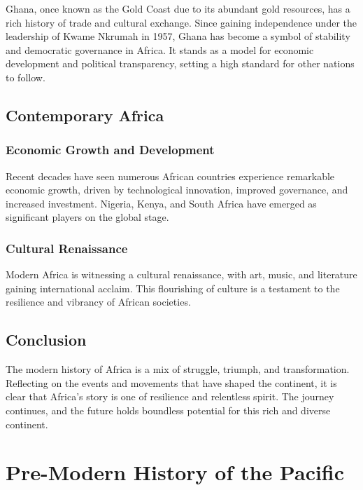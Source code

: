 \documentclass[a4paper,12pt]{book}
\begin{document}
Ghana, once known as the Gold Coast due to its abundant gold resources, has a rich history of trade and cultural exchange. Since gaining independence under the leadership of Kwame Nkrumah in 1957, Ghana has become a symbol of stability and democratic governance in Africa. It stands as a model for economic development and political transparency, setting a high standard for other nations to follow.

\section{Contemporary Africa}
\label{sec:contemporary-africa}

\subsection{Economic Growth and Development}
\label{subsec:economic-growth-and-development}

Recent decades have seen numerous African countries experience remarkable economic growth, driven by technological innovation, improved governance, and increased investment. Nigeria, Kenya, and South Africa have emerged as significant players on the global stage.

\subsection{Cultural Renaissance}
\label{subsec:cultural-renaissance}

Modern Africa is witnessing a cultural renaissance, with art, music, and literature gaining international acclaim. This flourishing of culture is a testament to the resilience and vibrancy of African societies.

\section{Conclusion}
\label{sec:conclusion-modern-africa}

The modern history of Africa is a mix of struggle, triumph, and transformation. Reflecting on the events and movements that have shaped the continent, it is clear that Africa’s story is one of resilience and relentless spirit. The journey continues, and the future holds boundless potential for this rich and diverse continent.

\chapter{Pre-Modern History of the Pacific}
\label{ch:pre-modern-pacific-history}
\end{document}
